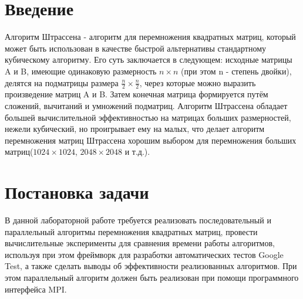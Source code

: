 \documentclass{report}
\begin{document}
\setcounter{page}{2}

\tableofcontents
\newpage

\section*{Введение}
\par Алгоритм Штрассена - алгоритм для перемножения квадратных матриц, который может быть использован в качестве быстрой альтернативы стандартному кубическому алгоритму. Его суть заключается в следующем: исходные матрицы A и B, имеющие одинаковую размерность $n \times n$ (при этом n - степень двойки), делятся на подматрицы размера $\frac{n}{2} \times \frac{n}{2}$, через которые можно выразить произведение матриц A и B. Затем конечная матрица формируется путём сложений, вычитаний и умножений подматриц. Алгоритм Штрассена обладает большей вычислительной эффективностью на матрицах больших размерностей, нежели кубический, но проигрывает ему на малых, что делает алгоритм перемножения матриц Штрассена хорошим выбором для перемножения больших матриц($1024 \times 1024$, $2048 \times 2048$ и т.д.).
\newpage

\section*{Постановка задачи}
\par В данной лабораторной работе требуется реализовать последовательный и параллельный алгоритмы перемножения квадратных матриц, провести вычислительные эксперименты для сравнения времени работы алгоритмов, используя при этом фреймворк для разработки автоматических тестов Google Test, а также сделать выводы об эффективности реализованных алгоритмов. При этом параллельный алгоритм должен быть реализован при помощи программного интерфейса MPI.
\newpage

\end{document}
